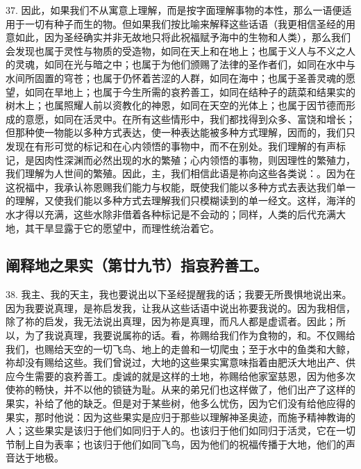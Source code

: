 37. 因此，如果我们不从寓意上理解，而是按字面理解事物的本性，那么一语便适用于一切有种子而生的物。但如果我们按比喻来解释这些话语（我更相信圣经的用意如此，因为圣经确实并非无故地只将此祝福赋予海中的生物和人类），那么我们会发现也属于灵性与物质的受造物，如同在天上和在地上；也属于义人与不义之人的灵魂，如同在光与暗之中；也属于为他们颁赐了法律的圣作者们，如同在水中与水间所固置的穹苍；也属于仍怀着苦涩的人群，如同在海中；也属于圣善灵魂的愿望，如同在旱地上；也属于今生所需的哀矜善工，如同在结种子的蔬菜和结果实的树木上；也属照耀人前以资教化的神恩，如同在天空的光体上；也属于因节德而形成的意愿，如同在活灵中。在所有这些情形中，我们都找得到众多、富饶和增长；但那种使一物能以多种方式表达，使一种表达能被多种方式理解，因而的，我们只发现在有形可觉的标记和在心内领悟的事物中，而不在别处。我们理解的有声标记，是因肉性深渊而必然出现的水的繁殖；心内领悟的事物，则因理性的繁殖力，我们理解为人世间的繁殖。因此，主，我们相信此语是祢向这些各类说：。因为在这祝福中，我承认祢恩赐我们能力与权能，既使我们能以多种方式去表达我们单一的理解，又使我们能以多种方式去理解我们只模糊读到的单一经文。这样，海洋的水才得以充满，这些水除非借着各种标记是不会动的；同样，人类的后代充满大地，其干旱显露于它的愿望中，而理性统治着它。\par


\subsection{阐释地之果实（第廿九节）指哀矜善工。}

38. 我主、我的天主，我也要说出以下圣经提醒我的话；我要无所畏惧地说出来。因为我要说真理，是祢启发我，让我从这些话语中说出祢要我说的。因为我相信，除了祢的启发，我无法说出真理，因为祢是真理，而凡人都是虚谎者。因此；所以，为了我说真理，我要说属祢的话。看，祢赐给我们作为食物的，和。不仅赐给我们，也赐给天空的一切飞鸟、地上的走兽和一切爬虫；至于水中的鱼类和大鲸，祢却没有赐给这些。我们曾说过，大地的这些果实寓意味指着由肥沃大地出产、供应今生需要的哀矜善工。虔诚的就是这样的土地，祢赐给他家室慈恩，因为他多次使祢的畅快，并不以他的锁链为耻。从来的弟兄们也这样做了，他们出产了这样的果实，补给了他的缺乏。但是对于某些树，他多么忧伤，因为它们没有给他应得的果实，那时他说：因为这些果实是应归于那些以理解神圣奥迹，而施予精神教诲的人；这些果实是该归于他们如同归于人的。也该归于他们如同归于活灵，它在一切节制上自为表率；也该归于他们如同飞鸟，因为他们的祝福传播于大地，他们的声音达于地极。\par

